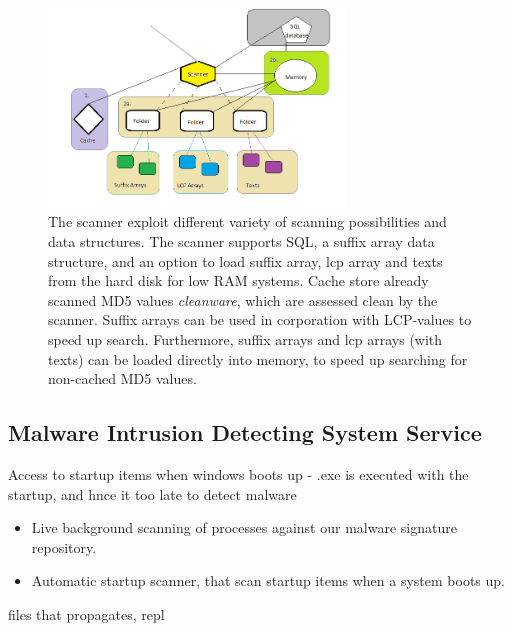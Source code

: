 \documentclass[12pt]{article} %
\begin{document}
\begin{figure}[H]
    \centering
    \includegraphics[width=0.7\textwidth]{malwaresscanner}
    \captionsetup{width=0.8\textwidth}
    \caption{The scanner exploit different variety of scanning possibilities and data structures. The scanner supports SQL, a suffix array data structure, and an option to  load suffix array, lcp array and texts from the hard disk for low RAM systems. Cache store already scanned MD5 values \emph{cleanware}, which are assessed clean by the scanner. Suffix arrays can be used in corporation with LCP-values to speed up search. Furthermore, suffix arrays and lcp arrays (with texts) can be loaded directly into memory, to speed up searching for non-cached MD5 values.}
    \label{fig:totalmalware}
\end{figure}


\subsection{Malware Intrusion Detecting System Service}
Access to startup items when windows boots up - .exe is executed with the startup, and hnce it too late to detect malware
\begin{itemize}
  \item Live background scanning of processes against our malware signature repository.
  \item Automatic startup scanner, that scan startup items when a system boots up.
\end{itemize}
files that propagates, repl
\end{document}
